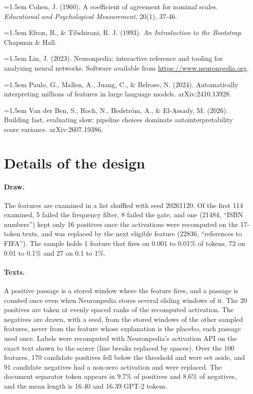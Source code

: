 \documentclass[11pt]{article}
\newcommand{\bibentree}[1]{\par\noindent\hangindent=1.5em\hangafter=1 #1\par\vspace{0.5em}}
\begin{document}
\bibentree{Cohen, J. (1960). A coefficient of agreement for nominal scales.
\emph{Educational and Psychological Measurement}, 20(1), 37-46.}

\bibentree{Efron, B., \& Tibshirani, R. J. (1993). \emph{An Introduction to the
Bootstrap}. Chapman \& Hall.}

\bibentree{Lin, J. (2023). Neuronpedia: interactive reference and tooling for analyzing
neural networks. Software available from \url{https://www.neuronpedia.org}.}

\bibentree{Paulo, G., Mallen, A., Juang, C., \& Belrose, N. (2024). Automatically
interpreting millions of features in large language models. arXiv:2410.13928.}

\bibentree{Van der Ben, S., Roch, N., Hedstr\"om, A., \& El-Assady, M. (2026). Building
fast, evaluating slow: pipeline choices dominate autointerpretability score variance.
arXiv:2607.19386.}

\newpage
\appendix

\section{Details of the design}

\paragraph{Draw.} The features are examined in a list shuffled with seed 20261120.
Of the first 114 examined, 5 failed the frequency filter, 8 failed the gate, and one
(21484, ``ISBN numbers'') kept only 16 positives once the activations were recomputed
on the 17-token texts, and was replaced by the next eligible feature (22836,
``references to FIFA''). The sample holds 1 feature that fires on 0.001 to 0.01\% of
tokens, 72 on 0.01 to 0.1\% and 27 on 0.1 to 1\%.

\paragraph{Texts.} A positive passage is a stored window where the feature fires, and
a passage is counted once even when Neuronpedia stores several sliding windows of it.
The 20 positives are taken at evenly spaced ranks of the recomputed activation. The
negatives are drawn, with a seed, from the stored windows of the other sampled
features, never from the feature whose explanation is the placebo, each passage used
once. Labels were recomputed with Neuronpedia's activation API on the exact text shown
to the scorer (line breaks replaced by spaces). Over the 100 features, 170 candidate
positives fell below the threshold and were set aside, and 91 candidate negatives had a
non-zero activation and were replaced. The document separator token appears in 9.7\%
of positives and 8.6\% of negatives, and the mean length is 16.40 and 16.39 GPT-2 tokens.
\end{document}
